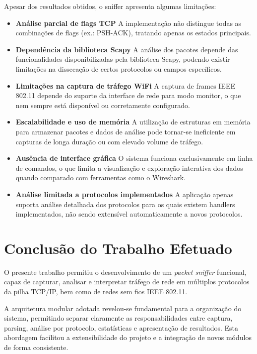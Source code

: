 \documentclass[a4paper,12pt]{article}
\begin{document}
Apesar dos resultados obtidos, o sniffer apresenta algumas limitações:

\begin{itemize}

\item \textbf{Análise parcial de flags TCP}  
A implementação não distingue todas as combinações de flags (ex.: PSH-ACK), tratando apenas os estados principais.

\item \textbf{Dependência da biblioteca Scapy}  
A análise dos pacotes depende das funcionalidades disponibilizadas pela biblioteca Scapy, podendo existir limitações na dissecação de certos protocolos ou campos específicos.

\item \textbf{Limitações na captura de tráfego WiFi}  
A captura de frames IEEE 802.11 depende do suporte da interface de rede para modo monitor, o que nem sempre está disponível ou corretamente configurado.

\item \textbf{Escalabilidade e uso de memória}  
A utilização de estruturas em memória para armazenar pacotes e dados de análise pode tornar-se ineficiente em capturas de longa duração ou com elevado volume de tráfego.

\item \textbf{Ausência de interface gráfica}  
O sistema funciona exclusivamente em linha de comandos, o que limita a visualização e exploração interativa dos dados quando comparado com ferramentas como o Wireshark.

\item \textbf{Análise limitada a protocolos implementados}  
A aplicação apenas suporta análise detalhada dos protocolos para os quais existem handlers implementados, não sendo extensível automaticamente a novos protocolos.

\end{itemize}

\section{Conclusão do Trabalho Efetuado}

O presente trabalho permitiu o desenvolvimento de um \textit{packet sniffer} funcional, capaz de capturar, analisar e interpretar tráfego de rede em múltiplos protocolos da pilha TCP/IP, bem como de redes sem fios IEEE 802.11.

A arquitetura modular adotada revelou-se fundamental para a organização do sistema, permitindo separar claramente as responsabilidades entre captura, parsing, análise por protocolo, estatísticas e apresentação de resultados. Esta abordagem facilitou a extensibilidade do projeto e a integração de novos módulos de forma consistente.
\end{document}
